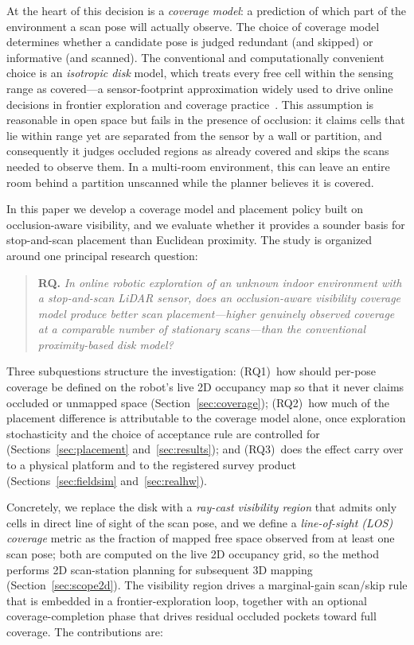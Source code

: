 \documentclass[sensors,article,submit,pdftex,moreauthors]{Definitions/mdpi}
\begin{document}
At the heart of this decision is a \emph{coverage model}: a prediction of which
part of the environment a scan pose will actually observe. The choice of
coverage model determines whether a candidate pose is judged redundant (and
skipped) or informative (and scanned). The conventional and computationally
convenient choice is an \emph{isotropic disk} model, which treats every free
cell within the sensing range as covered---a sensor-footprint approximation
widely used to drive online decisions in frontier exploration and coverage
practice~\cite{yamauchi1997,umari2017,choset2001,galceran2013,placed2023}. This assumption is reasonable in open
space but fails in the presence of occlusion: it claims cells that lie within
range yet are separated from the sensor by a wall or partition, and consequently
it judges occluded regions as already covered and skips the scans needed to
observe them. In a multi-room environment, this can leave an entire room behind
a partition unscanned while the planner believes it is covered.

In this paper we develop a coverage model and placement policy built on
occlusion-aware visibility, and we evaluate whether it provides a sounder basis
for stop-and-scan placement than Euclidean proximity. The study is organized
around one principal research question:
\begin{quote}
\textbf{RQ.} \emph{In online robotic exploration of an unknown indoor
environment with a stop-and-scan LiDAR sensor, does an occlusion-aware
visibility coverage model produce better scan placement---higher genuinely
observed coverage at a comparable number of stationary scans---than the
conventional proximity-based disk model?}
\end{quote}
Three subquestions structure the investigation: (RQ1)~how should per-pose
coverage be defined on the robot's live 2D occupancy map so that it never
claims occluded or unmapped space (Section~\ref{sec:coverage}); (RQ2)~how much
of the placement difference is attributable to the coverage model alone, once
exploration stochasticity and the choice of acceptance rule are controlled for
(Sections~\ref{sec:placement} and~\ref{sec:results}); and (RQ3)~does the
effect carry over to a physical platform and to the registered survey product
(Sections~\ref{sec:fieldsim} and~\ref{sec:realhw}).

Concretely, we replace the
disk with a \emph{ray-cast visibility region} that admits only cells in direct
line of sight of the scan pose, and we define a \emph{line-of-sight (LOS)
coverage} metric as the fraction of mapped free space observed from at least one
scan pose; both are computed on the live 2D occupancy grid, so the method
performs 2D scan-station planning for subsequent 3D mapping
(Section~\ref{sec:scope2d}). The visibility region drives a marginal-gain scan/skip rule that is
embedded in a frontier-exploration loop, together with an optional
coverage-completion phase that drives residual occluded pockets toward full
coverage. The contributions are:
\end{document}
